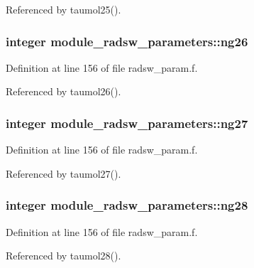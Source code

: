 Referenced by taumol25().

\subsubsection[{\texorpdfstring{ng26}{ng26}}]{\setlength{\rightskip}{0pt plus 5cm}integer module\+\_\+radsw\+\_\+parameters\+::ng26}\hypertarget{group__module__radsw__main_gafcc02ded0358f9465eb9987226522266}{}\label{group__module__radsw__main_gafcc02ded0358f9465eb9987226522266}


Definition at line 156 of file radsw\+\_\+param.\+f.



Referenced by taumol26().

\subsubsection[{\texorpdfstring{ng27}{ng27}}]{\setlength{\rightskip}{0pt plus 5cm}integer module\+\_\+radsw\+\_\+parameters\+::ng27}\hypertarget{group__module__radsw__main_ga56a6dfca4ad450a5ccc910864780a971}{}\label{group__module__radsw__main_ga56a6dfca4ad450a5ccc910864780a971}


Definition at line 156 of file radsw\+\_\+param.\+f.



Referenced by taumol27().

\subsubsection[{\texorpdfstring{ng28}{ng28}}]{\setlength{\rightskip}{0pt plus 5cm}integer module\+\_\+radsw\+\_\+parameters\+::ng28}\hypertarget{group__module__radsw__main_gaa2530abff6c981c3f3e70ef097f90ffc}{}\label{group__module__radsw__main_gaa2530abff6c981c3f3e70ef097f90ffc}


Definition at line 156 of file radsw\+\_\+param.\+f.



Referenced by taumol28().

